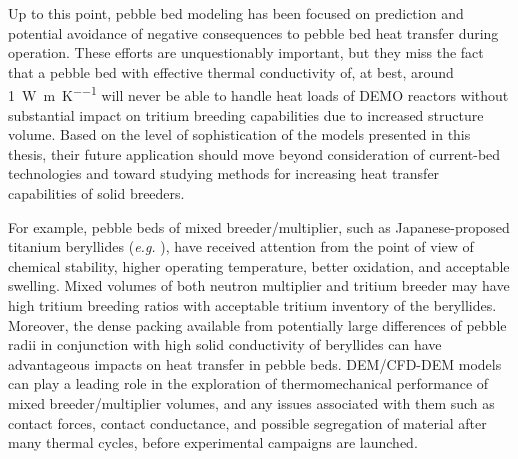 


Up to this point, pebble bed modeling has been focused on prediction and potential avoidance of negative consequences to pebble bed heat transfer during operation. These efforts are unquestionably important, but they miss the fact that a pebble bed with effective thermal conductivity of, at best, around \SI{1}{\watt\per\meter\per\kelvin} will never be able to handle heat loads of DEMO reactors without substantial impact on tritium breeding capabilities due to increased structure volume. Based on the level of sophistication of the models presented in this thesis, their future application should move beyond consideration of current-bed technologies and toward studying methods for increasing heat transfer capabilities of solid breeders.

For example, pebble beds of mixed breeder/multiplier, such as Japanese-proposed titanium beryllides (\textit{e.g.} ), have received attention from the point of view of chemical stability, higher operating temperature, better oxidation, and acceptable swelling. Mixed volumes of both neutron multiplier and tritium breeder may have high tritium breeding ratios with acceptable tritium inventory of the beryllides. Moreover, the dense packing available from potentially large differences of pebble radii in conjunction with high solid conductivity of beryllides can have advantageous impacts on heat transfer in pebble beds. DEM/CFD-DEM models can play a leading role in the exploration of thermomechanical performance of mixed breeder/multiplier volumes, and any issues associated with them such as contact forces, contact conductance, and possible segregation of material after many thermal cycles, before experimental campaigns are launched. 

